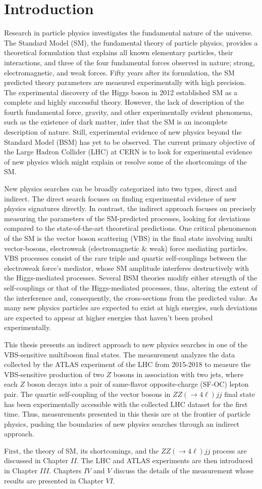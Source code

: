 \part{\LARGE{Introduction}}
\label{sec:Introduction}
Research in particle physics investigates the fundamental nature of the universe. The Standard Model (SM), the fundamental theory of particle physics, provides a theoretical formulation that explains all known elementary particles, their interactions, and three of the four fundamental forces observed in nature; strong, electromagnetic, and weak forces. Fifty years after its formulation, the SM predicted theory parameters are measured experimentally with high precision. The experimental discovery of the Higgs boson in 2012 established SM as a complete and highly successful theory. However, the lack of description of the fourth fundamental force, gravity, and other experimentally evident phenomena, such as the existence of dark matter, infer that the SM is an incomplete description of nature. Still, experimental evidence of new physics beyond the Standard Model (BSM) has yet to be observed. The current primary objective of the Large Hadron Collider (LHC) at CERN is to look for experimental evidence of new physics which might explain or resolve some of the shortcomings of the SM. 

New physics searches can be broadly categorized into two types, direct and indirect. The direct search focuses on finding experimental evidence of new physics signatures directly. In contrast, the indirect approach focuses on precisely measuring the parameters of the SM-predicted processes, looking for deviations compared to the state-of-the-art theoretical predictions. One critical phenomenon of the SM is the vector boson scattering (VBS) in the final state involving multi vector-bosons, electroweak (electromagnetic $\&$ weak) force mediating particles. VBS processes consist of the rare triple and quartic self-couplings between the electroweak force's mediator, whose SM amplitude interferes destructively with the Higgs-mediated processes. Several BSM theories modify either strength of the self-couplings or that of the Higgs-mediated processes, thus, altering the extent of the interference and, consequently, the cross-sections from the predicted value. As many new physics particles are expected to exist at high energies, such deviations are expected to appear at higher energies that haven't been probed experimentally. 

This thesis presents an indirect approach to new physics searches in one of the VBS-sensitive multiboson final states. The measurement analyzes the data collected by the ATLAS experiment of the LHC from 2015-2018 to measure the VBS-sensitive production of two $Z$ bosons in association with two jets, where each $Z$ boson decays into a pair of same-flavor opposite-charge (SF-OC) lepton pair. The quartic self-coupling of the vector bosons in $ZZ(\rightarrow 4\ell)jj$ final state has been experimentally accessible with the collected LHC dataset for the first time. Thus, measurements presented in this thesis are at the frontier of particle physics, pushing the boundaries of new physics searches through an indirect approach. 

First, the theory of SM, its shortcomings, and the $ZZ(\rightarrow 4\ell)jj$ process are discussed in Chapter $II$. The LHC and ATLAS experiments are then introduced in Chapter $III$. Chapters $IV$ and $V$ discuss the details of the measurement whose results are presented in Chapter $VI$. 
